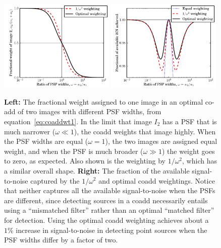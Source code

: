 \documentclass[letterpaper,preprint]{aastex}
\newcommand{\equationname}{equation}
\newcommand{\eqnref}[1]{\mbox{\equationname~\ref{#1}}}
\newcommand{\figpart}[1]{\textbf{#1}}
\begin{document}
\begin{figure}
\begin{center}
\includegraphics[width=0.49\textwidth]{coadd-weight-1}
\includegraphics[width=0.49\textwidth]{coadd-weight-2}
\end{center}
\caption{\figpart{Left:} The fractional weight assigned to one image
  in an optimal co-add of two images with different PSF widths, from
  \eqnref{eq:coaddwt1}.  In the limit that image $I_2$ has a PSF that
  is much narrower ($\omega \ll 1$), the coadd weights that image
  highly.  When the PSF widths are equal ($\omega = 1$), the two
  images are assigned equal weight, and when the PSF is much broader
  ($\omega \gg 1$) the weight goes to zero, as expected.  Also shown is
  the weighting by $1/\omega^2$, which has a similar overall shape.
  \figpart{Right:} The fraction of the available signal-to-noise
  captured by the $1/\omega^2$ and optimal coadd weightings.  Notice
  that neither captures all the available signal-to-noise when the
  PSFs are different, since detecting sources in a coadd necessarily
  entails using a ``mismatched filter'' rather than an optimal
  ``matched filter'' for detection.  Using the optimal coadd weighting
  achieves about a $1\%$ increase in signal-to-noise in detecting
  point sources when the PSF widths differ by a factor of two.
  \label{fig:coaddwt1}}
\end{figure}
\end{document}
